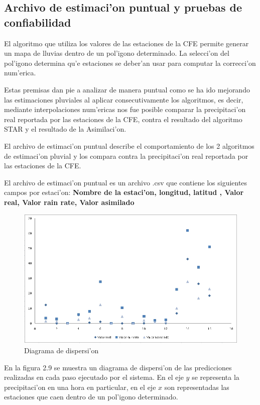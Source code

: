 \subsection{Archivo de estimaci'on puntual y pruebas de confiabilidad}
El algoritmo que utiliza los valores de las estaciones de la CFE permite generar un mapa de lluvias dentro de un pol'igono
determinado. La selecci'on del pol'igono determina qu'e estaciones se deber'an usar para computar la correcci'on num'erica.

Estas premisas dan pie a analizar de manera puntual como se ha ido mejorando las estimaciones pluviales al aplicar
consecutivamente los algoritmos, es decir, mediante interpolaciones num'ericas nos fue posible comparar la precipitaci'on
real reportada por las estaciones de la CFE, contra el resultado del algoritmo STAR y el resultado de la Asimilaci'on.


El archivo de estimaci'on puntual describe el comportamiento de los 2 algoritmos de estimaci'on pluvial y los compara
contra la precipitaci'on real reportada por las estaciones de la CFE.

El archivo de estimaci'on puntual es un archivo .csv que contiene los siguientes campos por estaci'on: 
\textbf{Nombre de la estaci'on, longitud, latitud , Valor real, Valor rain rate, Valor asimilado}


\begin{figure}[h!]
 \centering
 \includegraphics[width=150mm,bb=0 0 837 507]{./imagenes/archivoErrorAnalysis.png}
 \caption{Diagrama de dispersi'on}
\end{figure}

En la figura 2.9 se muestra un diagrama de dispersi'on de las predicciones realizadas en cada paso ejecutado por el sistema.
En el eje ${y}$ se representa la precipitaci'on en una hora en particular, 
en el eje $x$ son representadas las estaciones que caen dentro de un pol'igono
determinado. 


